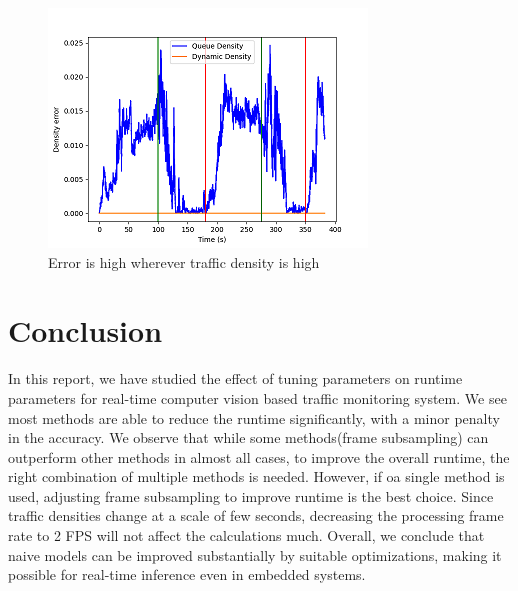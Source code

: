 \documentclass[conference]{IEEEtran}
\begin{document}
\begin{figure}[htbp]
\centerline{\includegraphics{plots/plot_lowres_error.png}}
\caption{Error is high wherever traffic density is high}
\label{low_res_err} 
\end{figure}

\section{Conclusion}

In this report, we have studied the effect of tuning parameters on runtime parameters for real-time computer vision based traffic monitoring system.
We see most methods are able to reduce the runtime significantly, with a minor penalty in the accuracy.
We observe that while some methods(frame subsampling) can outperform other methods in almost all cases, to improve the overall runtime, the right combination of multiple methods is needed.
However, if oa single method is used, adjusting frame subsampling to improve runtime is the best choice. Since traffic densities change at a scale of few seconds, decreasing the processing frame rate to 2 FPS will not affect the calculations much.
Overall, we conclude that naive models can be improved substantially by suitable optimizations, making it possible for real-time inference even in embedded systems.





\end{document}
